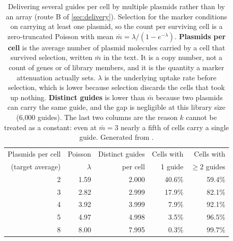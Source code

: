 \begin{table}[htbp]\centering
\footnotesize
\caption[]{Delivering several guides per cell by multiple plasmids rather than by an array (route B of \cref{sec:delivery}). Selection for the marker conditions on carrying at least one plasmid, so the count per surviving cell is a zero-truncated Poisson with mean $\bar m = \lambda/(1-e^{-\lambda})$. \textbf{Plasmids per cell} is the average number of plasmid molecules carried by a cell that survived selection, written $\bar m$ in the text. It is a copy number, not a count of genes or of library members, and it is the quantity a marker attenuation actually sets. $\lambda$ is the underlying uptake rate before selection, which is lower because selection discards the cells that took up nothing. \textbf{Distinct guides} is lower than $\bar m$ because two plasmids can carry the same guide, and the gap is negligible at this library size (6{,}000 guides). The last two columns are the reason $k$ cannot be treated as a constant: even at $\bar m = 3$ nearly a fifth of cells carry a single guide. Generated from .}\label{tab:delivery}
\begin{tabular}{rrrrr}
\toprule
Plasmids per cell & Poisson & Distinct guides & Cells with & Cells with \\
(target average) & $\lambda$ & per cell & 1 guide & $\ge 2$ guides \\
\midrule
2 & 1.59 & 2.000 & 40.6\% & 59.4\% \\
3 & 2.82 & 2.999 & 17.9\% & 82.1\% \\
4 & 3.92 & 3.999 & 7.9\% & 92.1\% \\
5 & 4.97 & 4.998 & 3.5\% & 96.5\% \\
8 & 8.00 & 7.995 & 0.3\% & 99.7\% \\
\bottomrule
\end{tabular}
\end{table}
